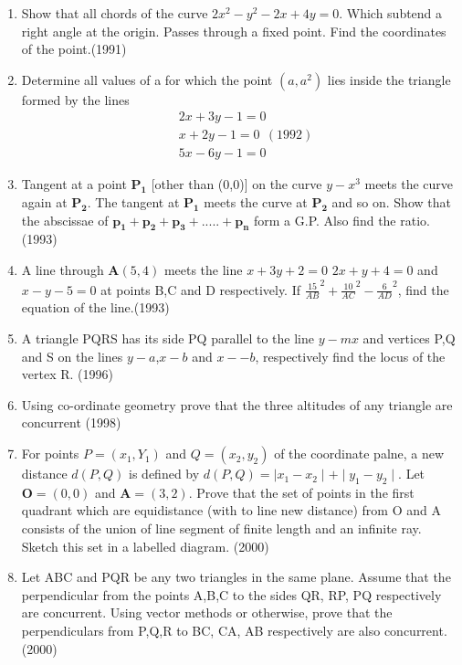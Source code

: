 \documentclass[12pt]{article}
\let\vec\mathbf
\begin{document}
\begin{enumerate}
\newpage
\item Show that all chords of the curve  $2x^2-y^2-2x+4y=0$. Which subtend a right angle at the origin. Passes through a fixed point. Find the coordinates of the point.(1991)\\
\item Determine all values of a for which the point $(a, a^2)$ lies inside the triangle formed by the lines\\
\begin{align}
 &2x+3y-1 =0 \\
 &x+2y-1 =0 \ \: (1992)\\
 &5x-6y-1 =0 
\end{align}

\item Tangent at a point $\vec{P_1}$ [other than (0,0)] on the curve $y-x^3$ meets the curve again at $\vec{P_2}$. The tangent at $\vec{P_1}$ meets the curve at $\vec{P_2}$ and so on. Show that the abscissae of $\vec{p_1+p_2+p_3+.....+p_n}$ form a G.P. Also find the ratio.(1993)\\
\item A line through $\vec{A}(5,4)$ meets the line $x+3y+2=0$ $2x+y+4=0$ and $x-y-5=0$ at points B,C and D respectively. If    $\frac{15}{AB}^2+\frac{10}{AC}^2-\frac{6}{AD}^2$, find the equation of the line.(1993)\\
\item A triangle PQRS has its side PQ parallel to the line $y-mx$ and vertices P,Q and S on the lines $y-a$,$ x-b$ and $x--b$, respectively find the locus of the vertex R. (1996)\\
\item Using co-ordinate geometry prove that the three altitudes of any triangle are concurrent (1998)\\
\item For points $P=(x_1,Y_1)$ and $Q=(x_2,y_2)$ of the coordinate palne, a new distance $d(P,Q)$ is defined by $d(P,Q)=\mid x_1-x_2\mid + \mid y_1-y_2\mid$. Let $\vec{O}=(0,0)$  and $\vec{A}=(3,2)$. Prove that the set of points in the first quadrant which are equidistance (with to line new distance) from O and A consists of the union of line segment of finite length and an infinite ray. Sketch this set in a labelled diagram. (2000)\\
\item Let ABC and PQR be any two triangles in the same plane. Assume that the perpendicular from the points A,B,C to the sides QR, RP, PQ respectively are concurrent. Using vector methods or otherwise, prove that the perpendiculars from P,Q,R to BC, CA, AB  respectively are also concurrent. (2000)\\

\end{enumerate}
\end{document}
